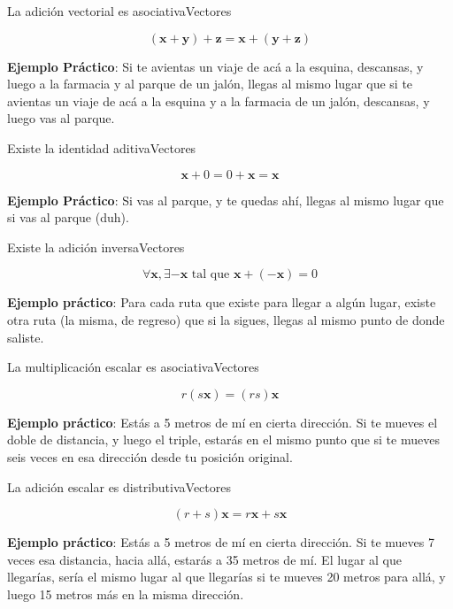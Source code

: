 \documentclass[spanish, c]{beamer}
\begin{document}
\begin{frame}{La adición vectorial es asociativa}{Vectores}
    
    $$(\mathbf{x} + \mathbf{y}) + \mathbf{z} = \mathbf{x} + (\mathbf{y} + \mathbf{z})$$

    \textbf{Ejemplo Práctico}: Si te avientas un viaje de acá a la esquina, descansas, y luego a la farmacia y al parque de un jalón, llegas al mismo lugar que si te avientas un viaje de acá a la esquina y a la farmacia de un jalón, descansas, y luego vas al parque.

\end{frame}

\begin{frame}{Existe la identidad aditiva}{Vectores}
    
    $$\mathbf{x} + 0 = 0 + \mathbf{x} = \mathbf{x}$$

    \textbf{Ejemplo Práctico}: Si vas al parque, y te quedas ahí, llegas al mismo lugar que si vas al parque (duh).

\end{frame}

\begin{frame}{Existe la adición inversa}{Vectores}

    $$\forall \mathbf{x}, \exists -\mathbf{x} \text{ tal que } \mathbf{x} + (-\mathbf{x}) = 0$$

    \textbf{Ejemplo práctico}: Para cada ruta que existe para llegar a algún lugar, existe otra ruta (la misma, de regreso) que si la sigues, llegas al mismo punto de donde saliste.
\end{frame}

\begin{frame}{La multiplicación escalar es asociativa}{Vectores}    
    
    $$r(s \mathbf{x}) = (rs)\mathbf{x}$$

    \textbf{Ejemplo práctico}: Estás a 5 metros de mí en cierta dirección. Si te mueves el doble de distancia, y luego el triple, estarás en el mismo punto que si te mueves seis veces en esa dirección desde tu posición original.

\end{frame}

\begin{frame}{La adición escalar es distributiva}{Vectores}
    
    $$(r + s)\mathbf{x} = r\mathbf{x} + s\mathbf{x}$$

    \textbf{Ejemplo práctico}: Estás a 5 metros de mí en cierta dirección. Si te mueves 7 veces esa distancia, hacia allá, estarás a 35 metros de mí. El lugar al que llegarías, sería el mismo lugar al que llegarías si te mueves 20 metros para allá, y luego 15 metros más en la misma dirección.

\end{frame}
\end{document}
